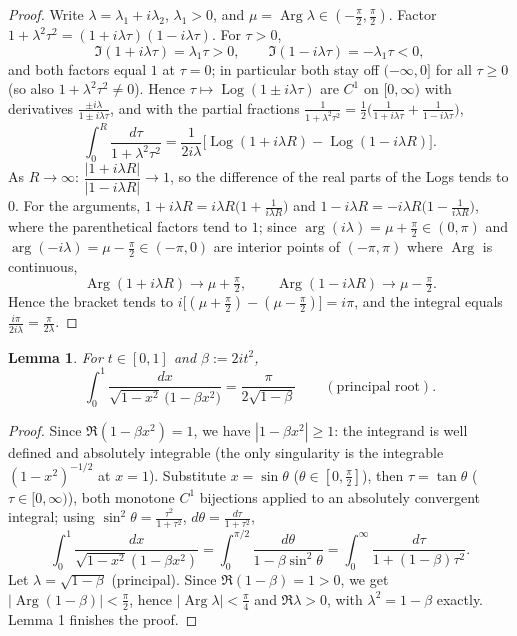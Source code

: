 \documentclass[11pt]{article}
\newtheorem{lemma}{Lemma}
\theoremstyle{remark}
\begin{document}
\begin{proof}
Write $\lambda=\lambda_1+i\lambda_2$, $\lambda_1>0$, and $\mu=\operatorname{Arg}\lambda\in(-\tfrac\pi2,\tfrac\pi2)$. Factor $1+\lambda^2\tau^2=(1+i\lambda\tau)(1-i\lambda\tau)$. For $\tau>0$,
$$\Im(1+i\lambda\tau)=\lambda_1\tau>0,\qquad \Im(1-i\lambda\tau)=-\lambda_1\tau<0,$$
and both factors equal $1$ at $\tau=0$; in particular both stay off $(-\infty,0]$ for all $\tau\ge0$ (so also $1+\lambda^2\tau^2\neq0$). Hence $\tau\mapsto\operatorname{Log}(1\pm i\lambda\tau)$ are $C^1$ on $[0,\infty)$ with derivatives $\frac{\pm i\lambda}{1\pm i\lambda\tau}$, and with the partial fractions $\frac{1}{1+\lambda^2\tau^2}=\frac12\Big(\frac{1}{1+i\lambda\tau}+\frac{1}{1-i\lambda\tau}\Big)$,
$$\int_0^R\frac{d\tau}{1+\lambda^2\tau^2}
=\frac{1}{2i\lambda}\Big[\operatorname{Log}(1+i\lambda R)-\operatorname{Log}(1-i\lambda R)\Big].$$
As $R\to\infty$: $\dfrac{|1+i\lambda R|}{|1-i\lambda R|}\to1$, so the difference of the real parts of the Logs tends to $0$. For the arguments, $1+i\lambda R=i\lambda R\big(1+\frac{1}{i\lambda R}\big)$ and $1-i\lambda R=-i\lambda R\big(1-\frac{1}{i\lambda R}\big)$, where the parenthetical factors tend to $1$; since $\arg(i\lambda)=\mu+\frac\pi2\in(0,\pi)$ and $\arg(-i\lambda)=\mu-\frac\pi2\in(-\pi,0)$ are interior points of $(-\pi,\pi)$ where $\operatorname{Arg}$ is continuous,
$$\operatorname{Arg}(1+i\lambda R)\to\mu+\tfrac\pi2,\qquad \operatorname{Arg}(1-i\lambda R)\to\mu-\tfrac\pi2 .$$
Hence the bracket tends to $i\big[(\mu+\tfrac\pi2)-(\mu-\tfrac\pi2)\big]=i\pi$, and the integral equals $\frac{i\pi}{2i\lambda}=\frac{\pi}{2\lambda}$.
\end{proof}

\begin{lemma}
\textit{For $t\in[0,1]$ and $\beta:=2it^2$,}
$$\int_0^1\frac{dx}{\sqrt{1-x^2}\,\big(1-\beta x^2\big)}=\frac{\pi}{2\sqrt{1-\beta}}\qquad(\text{principal root}).$$
\end{lemma}

\begin{proof}
Since $\Re(1-\beta x^2)=1$, we have $|1-\beta x^2|\ge1$: the integrand is well defined and absolutely integrable (the only singularity is the integrable $(1-x^2)^{-1/2}$ at $x=1$). Substitute $x=\sin\theta$ ($\theta\in[0,\tfrac\pi2]$), then $\tau=\tan\theta$ ($\tau\in[0,\infty)$), both monotone $C^1$ bijections applied to an absolutely convergent integral; using $\sin^2\theta=\frac{\tau^2}{1+\tau^2}$, $d\theta=\frac{d\tau}{1+\tau^2}$,
$$\int_0^1\frac{dx}{\sqrt{1-x^2}(1-\beta x^2)}
=\int_0^{\pi/2}\frac{d\theta}{1-\beta\sin^2\theta}
=\int_0^\infty\frac{d\tau}{1+(1-\beta)\tau^2}.$$
Let $\lambda=\sqrt{1-\beta}$ (principal). Since $\Re(1-\beta)=1>0$, we get $|\operatorname{Arg}(1-\beta)|<\tfrac\pi2$, hence $|\operatorname{Arg}\lambda|<\tfrac\pi4$ and $\Re\lambda>0$, with $\lambda^2=1-\beta$ exactly. Lemma 1 finishes the proof.
\end{proof}
\end{document}

